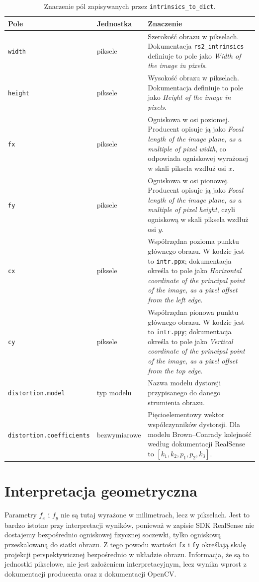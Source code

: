 \documentclass[12pt,a4paper]{report}
\begin{document}
\begin{table}[htbp]
    \centering
    \caption{Znaczenie pól zapisywanych przez \texttt{intrinsics\_to\_dict}.}
    \label{tab:intrinsics-meaning}
    \begin{tabular}{@{}p{2.6cm}p{3.2cm}p{8cm}@{}}
        \toprule
        \textbf{Pole} & \textbf{Jednostka} & \textbf{Znaczenie} \\
        \midrule
        \texttt{width} & piksele & Szerokość obrazu w pikselach. Dokumentacja \texttt{rs2\_intrinsics} definiuje to pole jako \emph{Width of the image in pixels}. \\
        \texttt{height} & piksele & Wysokość obrazu w pikselach. Dokumentacja definiuje to pole jako \emph{Height of the image in pixels}. \\
        \texttt{fx} & piksele & Ogniskowa w osi poziomej. Producent opisuje ją jako \emph{Focal length of the image plane, as a multiple of pixel width}, co odpowiada ogniskowej wyrażonej w skali piksela wzdłuż osi $x$. \\
        \texttt{fy} & piksele & Ogniskowa w osi pionowej. Producent opisuje ją jako \emph{Focal length of the image plane, as a multiple of pixel height}, czyli ogniskową w skali piksela wzdłuż osi $y$. \\
        \texttt{cx} & piksele & Współrzędna pozioma punktu głównego obrazu. W kodzie jest to \texttt{intr.ppx}; dokumentacja określa to pole jako \emph{Horizontal coordinate of the principal point of the image, as a pixel offset from the left edge}. \\
        \texttt{cy} & piksele & Współrzędna pionowa punktu głównego obrazu. W kodzie jest to \texttt{intr.ppy}; dokumentacja określa to pole jako \emph{Vertical coordinate of the principal point of the image, as a pixel offset from the top edge}. \\
        \texttt{distortion.model} & typ modelu & Nazwa modelu dystorsji przypisanego do danego strumienia obrazu. \\
        \texttt{distortion.coefficients} & bezwymiarowe & Pięcioelementowy wektor współczynników dystorsji. Dla modelu Brown--Conrady kolejność według dokumentacji RealSense to \mbox{$[k_1, k_2, p_1, p_2, k_3]$}. \\
        \bottomrule
    \end{tabular}
\end{table}

\section{Interpretacja geometryczna}
Parametry $f_x$ i $f_y$ nie są tutaj wyrażone w milimetrach, lecz w pikselach. Jest to bardzo
istotne przy interpretacji wyników, ponieważ w zapisie SDK RealSense nie dostajemy bezpośrednio
ogniskowej fizycznej soczewki, tylko ogniskową przeskalowaną do siatki obrazu. Z tego powodu
wartości \texttt{fx} i \texttt{fy} określają skalę projekcji perspektywicznej bezpośrednio
w układzie obrazu. Informacja, że są to jednostki pikselowe, nie jest założeniem interpretacyjnym,
lecz wynika wprost z dokumentacji producenta oraz z dokumentacji OpenCV.
\end{document}
